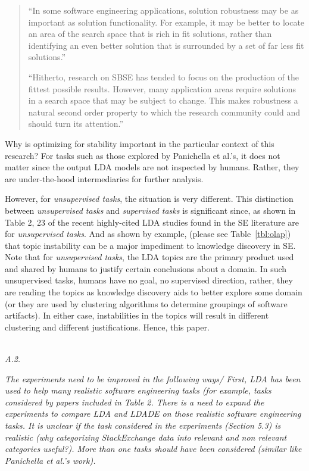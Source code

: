 \documentclass[twocolumn,5p,sort&compress]{elsarticle}
\theoremstyle{break}
\begin{document}
\begin{quote}
``In some software engineering applications, solution robustness may be as important
as solution functionality. For example, it may be better to locate an area
of the search space that is rich in fit solutions, rather than identifying an even
better solution that is surrounded by a set of far less fit solutions.''

``Hitherto, research on SBSE has tended to focus on the production of the fittest
possible results. However, many application areas require solutions in a search
space that may be subject to change. This makes robustness a natural second
order property to which the research community could and should turn its attention.''
\end{quote}
Why is optimizing for stability important in the particular context of this research? For tasks such as those explored by  Panichella et al.'s, it does not matter since the output LDA models are not inspected by humans. Rather, they are under-the-hood intermediaries
for further analysis.

However, for {\em unsupervised tasks}, the situation is very different. This distinction between  {\em unsupervised tasks} and  {\em supervised tasks} is significant since,
as shown in Table 2, 23 of the recent highly-cited LDA  studies found in the SE literature are for {\em unsupervised tasks}. And
as shown by example, (please see Table~\ref{tbl:olap}) that topic instability can be a major impediment to knowledge discovery in SE. 
Note that for {\em unsupervised tasks},  the LDA topics are the primary product used and shared by humans to justify certain conclusions about a domain. In such unsupervised tasks, humans have no goal, no supervised direction, rather, they are reading the topics as knowledge discovery aids to better explore some domain
(or they are used by clustering algorithms to determine groupings of software artifacts).
In either case, instabilities in the topics will result in different clustering and different justifications. Hence, this paper.



\noindent
\textit{\\A.2.} 

\textit{The experiments need to be improved in the following ways/ First, LDA has been used to help many realistic software engineering tasks (for example, tasks considered by papers included in Table 2. There is a need to expand the experiments to compare LDA and LDADE on those realistic software engineering tasks. It is unclear if the task considered in the experiments (Section 5.3) is realistic (why categorizing StackExchange data into relevant and non relevant categories useful?). More than one tasks should have been considered (similar like Panichella et al.'s work).\\}
\end{document}

